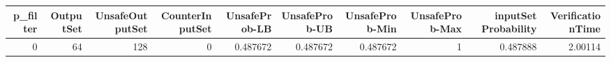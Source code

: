 \begin{tabular}{rrrrrrrrrr}
\hline
   p\_filter &   OutputSet &   UnsafeOutputSet &   CounterInputSet &   UnsafeProb-LB &   UnsafeProb-UB &   UnsafeProb-Min &   UnsafeProb-Max &   inputSet Probability &   VerificationTime \\
\hline
          0 &          64 &               128 &                 0 &        0.487672 &        0.487672 &         0.487672 &                1 &               0.487888 &            2.00114 \\
\hline
\end{tabular}
